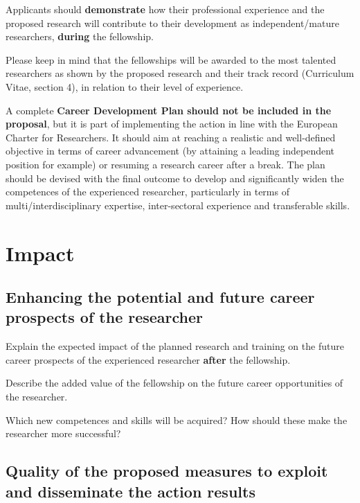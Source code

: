 Applicants should \textbf{demonstrate} how their professional experience and the proposed research will contribute to their development as independent/mature researchers, \textbf{during} the fellowship.

\medskip\noindent
Please keep in mind that the fellowships will be awarded to the most talented researchers as shown by the proposed research and their track record (Curriculum Vitae, section 4), in relation to their level of experience.

\medskip\noindent
A complete \textbf{Career Development Plan should not be included in the proposal}, but it is part of implementing the action in line with the European Charter for Researchers. It should aim at reaching a realistic and well-defined objective in terms of career advancement (by attaining a leading independent position for example) or resuming a research career after a break. The plan should be devised with the final outcome to develop and significantly widen the competences of the experienced researcher, particularly in terms of multi/interdisciplinary expertise, inter-sectoral experience and transferable skills.





\newpage
\section{Impact}
\label{sec:impact}

\subsection{Enhancing the potential and future career prospects of the researcher }
\label{sec:impact_researcher}
\medskip\noindent
Explain the expected impact of the planned research and training on the future career prospects of the experienced researcher \textbf{after} the fellowship.

\medskip\noindent
Describe the added value of the fellowship on the future career opportunities of the researcher. 

\medskip\noindent
Which new competences and skills will be acquired? How should these make the researcher more successful? 



\subsection{Quality of the proposed measures to exploit and disseminate the action results }
\label{sec:impact_dissemination}


